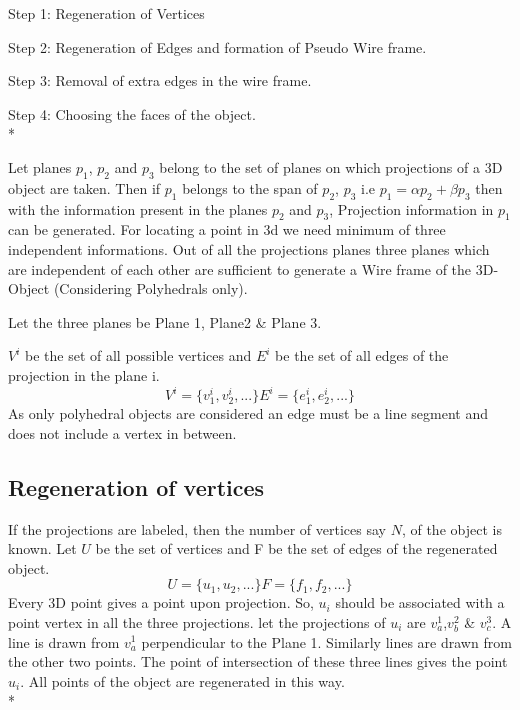 \documentclass[a4paper]{article}
\begin{document}
    Step 1: Regeneration of Vertices
    
    Step 2: Regeneration of Edges and formation of Pseudo Wire frame.
    
    Step 3: Removal of extra edges in the wire frame.
    
    Step 4: Choosing the faces of the object.
     \\*
     
     
     Let planes $p_1$, $p_2$ and $p_3$ belong to the set of planes on which projections of a 3D object are taken. Then if $p_1$ belongs to the span of $p_2$, $p_3$ i.e $ p_1=\alpha p_2 + \beta p_3$  then with the information present in the planes $p_2$ and $p_3$, Projection information in $p_1$ can be generated. For locating a point in 3d we need minimum of three independent informations. Out of all the projections planes three planes which are independent of each other are sufficient to generate a Wire frame of the 3D-Object (Considering Polyhedrals only). 
     
     
    
       Let the three planes be Plane 1, Plane2 \& Plane 3.
      
       $V^i$ be the set of all possible vertices and $E^i$ be the set of all edges  of the projection in the plane i.
    \begin{equation}
		V^i = \{ v^i_1, v^i_2, . . .\}
        E^i = \{ e^i_1, e^i_2, . . .\}      
    \end{equation}
    As only polyhedral objects are considered an edge must be a line segment and does not include a vertex in between.   
    \subsection{Regeneration of vertices}
    If the projections are labeled, then the number of vertices say $N$, of the object is known. 
    Let $U$ be the set of vertices and F be the set of edges of the regenerated object.
    \begin{equation}
		U = \{ u_1, u_2, . . .\}
        F = \{ f_1, f_2, . . .\}      
    \end{equation}
    Every 3D point gives a point upon projection. So, $u_i$ should be associated with a point vertex in all the three projections.
    let the projections of $u_i$ are $v^1_a$,$v^2_b$ \& $v^3_c$.
    A line is drawn from $v^1_a$ perpendicular to the Plane 1. Similarly lines are drawn from the other two points. The point of intersection of these three lines gives the point $u_i$.
    All points of the object are regenerated in this way.
    \\*
\end{document}
